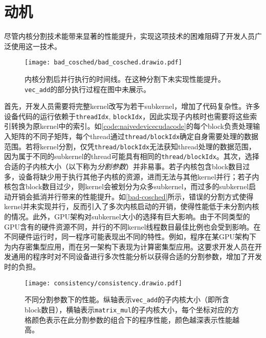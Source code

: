 \chapter{动机}\label{chap:motivation}

尽管内核分割技术能带来显著的性能提升，实现这项技术的困难阻碍了开发人员广泛使用这一技术。

\begin{figure}[htbp]
    \centering
    \texttt{[image: bad\_cosched/bad\_cosched.drawio.pdf]}
    \caption{内核分割后并行执行的时间线。在这种分割下未实现性能提升。\texttt{vec\_add}的部分执行过程在图中未展示。}
    \label{bad-cosched}    
\end{figure}

首先，开发人员需要将完整kernel改写为若干subkernel，增加了代码复杂性。许多设备代码的运行依赖于\texttt{threadIdx}, \texttt{blockIdx}，因此实现子内核时也需要将这些索引转换为原kernel中的索引。如\autoref{code:naivedevicecudacode}的每个block负责处理输入矩阵的不同子矩阵，每个thread通过\texttt{thread/blockIdx}确定自身需要处理的数据范围。若将kernel分割，仅凭\texttt{thread/blockIdx}无法获知thread处理的数据范围，因为属于不同的subkernel的thread可能具有相同的\texttt{thread/blockIdx}。其次，选择合适的子内核大小（以下称为\emph{分割参数}）并非易事。若子内核包含block数目过多，设备将缺少用于执行其他子内核的资源，进而无法与其他kernel并行；若子内核包含block数目过少，则kernel会被划分为众多subkernel，而过多的subkernel启动开销会抵消并行带来的性能提升。如\autoref{bad-cosched}所示，错误的分割方式使得kernel并未实现并行，反而引入了多次内核启动的开销，使得性能低于未分割内核的情况。此外，GPU架构对subkernel大小的选择有巨大影响。由于不同类型的GPU含有的硬件资源不同，并行的不同kernel线程数目最佳比例也会受到影响。在不同硬件运行时，同一程序可能表现出不同的特性\cite{10.1145/1498765.1498785}\cite{KONSTANTINIDIS201737}。例如，程序在某GPU架构下为内存密集型应用，而在另一架构下表现为计算密集型应用。这要求开发人员在开发通用的程序时对不同设备进行多次性能分析以获得合适的分割参数，增加了开发时的负担。

\begin{figure}[htbp]
    \centering
    \texttt{[image: consistency/consistency.drawio.pdf]}
    \caption{不同分割参数下的性能。纵轴表示\texttt{vec\_add}的子内核大小（即所含block数目），横轴表示\texttt{matrix\_mul}的子内核大小，每个坐标对应的方格颜色表示在此分割参数的组合下的程序性能，颜色越深表示性能越高。}
    \label{consistency}
\end{figure}

